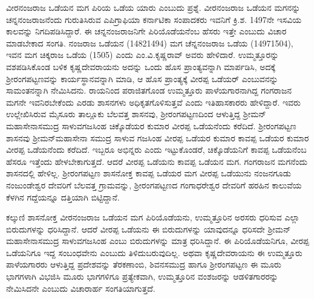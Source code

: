 ವೀರನಂಜರಾಜ ಒಡೆಯನ ಮಗ ಪಿರಿಯ ಒಡೆಯ ಯಾರು ಎಂಬುದು ಪ್ರಶ್ನೆ. ವೀರನಂಜರಾಜ ಒಡೆಯನ ಮಗನನ್ನು ಚನ್ನನಂಜರಾಜನೆಂದು ಗುರುತಿಸಿರುವ ಎಪಿಗ್ರಾಫಿಯಾ ಕರ್ನಾಟಿಕಾ ಸಂಪಾದಕರು ಇವನಿಗೆ ಕ್ರಿ.ಶ. 1497ನೇ ಇಸವಿಯ ಕಾಲವನ್ನು ನಿಗದಿಪಡಿಸಿದ್ದಾರೆ. ಈ ಚನ್ನನಂಜರಾಜನಿಗೇ ಪಿರಿಯೊಡೆಯನೆಂಬ ಹೆಸರು ಇತ್ತೇ ಎಂಬುದು ವಿಚಾರ ಮಾಡಬೇಕಾದ ಸಂಗತಿ. ನಂಜರಾಜ ಒಡೆಯನ (14821494) ಮಗ ಚೆನ್ನನಂಜರಾಜ ಒಡೆಯ (14971504), ಇವನ ಮಗ ಚಿಕ್ಕರಾಜ ಒಡೆಯ (1505) ಎಂದು ಎಂ.ವಿ.ಕೃಷ್ಣರಾವ್​ ಅವರು ಹೇಳಿದಾರೆ. ಉಮ್ಮತ್ತೂರನ್ನು ವಶಪಡಿಸಿಕೊಂಡ ಬಳಿಕ ಕೃಷ್ಣದೇವರಾಯನು ಅದನ್ನು ಒಂದು ಹೊಸ ಪ್ರಾಂತ್ಯವನ್ನಾಗಿ ಮಾರ್ಪಡಿಸಿ, ಅದಕ್ಕೆ ಶ‍್ರೀರಂಗಪಟ್ಟಣವನ್ನು ಕಾರ್ಯಸ್ಥಾನವನ್ನಾಗಿ ಮಾಡಿ, ಆ ಹೊಸ ಪ್ರಾಂತ್ಯಕ್ಕೆ ವೀರಪ್ಪ ಒಡೆಯರ್​ ಎಂಬುವನನ್ನು ಸಾಮಂತನನ್ನಾಗಿ ನೇಮಿಸಿದನು. ರಾಯನಿಂದ ಪರಾಜಿತಗೊಂಡ ಉಮ್ಮತ್ತೂರು ಪಾಳೆಯಗಾರನಾಗಿದ್ದ ಗಂಗರಾಜನ ಮಗನೇ ಇವನಿರಬೇಕೆಂದು ಎರಡು ಶಾಸನಗಳು ಅಧಿಕೃತಗೊಳಿಸುತ್ತವೆ ಎಂದು ಇತಿಹಾಸಕಾರರು ಹೇಳಿದ್ದಾರೆ. ಇವರು ಉಲ್ಲೇಖಿಸಿರುವ ಮೈಸೂರು ತಾಲ್ಲೂಕು ಬೆಲವತ್ತ ಶಾಸನವು, ಶ‍್ರೀರಂಗಪಟ್ಟಣದಿಂದ ಆಳುತ್ತಿದ್ದ ಶ‍್ರೀಮನ್​ ಮಹಾಸೇನಾಸಮುದ್ರ ಸಾಳುವಗಜಸಿಂಹ ಚಿಕ್ಕೊಡೆಯರ ಕುಮಾರ ವೀರಪ್ಪ ಒಡೆಯನೆಂದು ಕರೆದಿದೆ. ಶ‍್ರೀರಂಗಪಟ್ಟಣ ಶಾಸನವು ಶ‍್ರೀಮನ್​ ಮಹಾಸೇನಾ ಸಮುದ್ರ ಸಾಳುವ ಗಜಸಿಂಹ ವೀರಪ್ಪ ಒಡೆಯರ ಕುಮಾರ ಕಾವಪ್ಪ ಒಡೆಯರ ಕುಮಾರ ವೀರಪ್ಪ ಒಡೆಯನೆಂದು ಕರೆದಿದೆ. ಇಬ್ಬರೂ ಅಭಿನ್ನರು ಎಂದು ಇಟ್ಟುಕೊಂಡರೆ, ಚಿಕ್ಕೊಡೆಯನಿಗೆ ಕಾವಪ್ಪ ಒಡೆಯನೆಂಬ ಹೆಸರೂ ಇತ್ತೆಂದು ಹೇಳಬೇಕಾಗುತ್ತದೆ. ಆದರೆ ವೀರಪ್ಪ ಒಡೆಯನು ಕಾವಪ್ಪ ಒಡೆಯನ ಮಗ. ಗಂಗರಾಜನ ಮಗನೆಂದು ಶಾಸನದಲ್ಲಿ ಹೇಳಿಲ್ಲ. ಶ‍್ರೀರಂಗಪಟ್ಟಣ ಶಾಸನೋಕ್ತ ಕಾವಪ್ಪ ಒಡೆಯರ ಮಗ ವೀರಪ್ಪ ಒಡೆಯುನು ನಂಜನಗೂಡು ನಂಜುಂಡೇಶ್ವರ ದೇವರಿಗೆ ಬೆಲವತ್ತ ಗ್ರಾಮವನ್ನು, ಶ‍್ರೀರಂಗಪಟ್ಟಣದ ಗಂಗಾಧರೇಶ್ವರ ದೇವರಿಗೆ ಹರಹಿನ ಕಾಲುವೆಯ ಕೆಳಗಿನ ಗದ್ದೆಯನ್ನೂ ದತ್ತಿಯಾಗಿ ಬಿಟ್ಟಿದ್ದಾನೆ. 

ಕಲ್ಕುಣಿ ಶಾಸನೋಕ್ತ ವೀರನಂಜರಾಜ ಒಡೆಯನ ಮಗ ಪಿರಿಯೊಡೆಯನು, ಉಮ್ಮತ್ತೂರಿನ ಅರಸರು ಧರಿಸುವ ಎಲ್ಲಾ ಬಿರುದುಗಳನ್ನು ಧರಿಸಿದ್ದಾನೆ. ಆದರೆ ವೀರಪ್ಪ ಒಡೆಯನು ಈ ಬಿರುದುಗಳನ್ನು ಯಾವುದನ್ನೂ ಧರಿಸದೇ ಶ‍್ರೀಮನ್​ ಮಹಾಸೇನಾಸಮುದ್ರ ಸಾಳುವಗಜಸಿಂಹ ಎಂಬು ಬಿರುದುಗಳನ್ನು ಮಾತ್ರ ಧರಿಸಿದ್ದಾನೆ. ಈ ಪಿರಿಯೊಡೆಯನಿಗೂ, ವೀರಪ್ಪ ಒಡೆಯನಿಗೂ ಇದ್ದ ಸಂಬಂಧವೇನು ಎಂಬುದು ತಿಳಿದುಬರುವುದಿಲ್ಲ. ಅಥವಾ ಕೃಷ್ಣದೇವರಾಯನು ಈ ಉಮ್ಮತ್ತೂರು ಪಾಳೆಯಗಾರರು ಆಳುತ್ತಿದ್ದ ಪ್ರದೇಶವನ್ನು ತೆರಕಣಾಂಬಿ, ಶಿವನಸಮುದ್ರ ಹಾಗೂ ಶ‍್ರೀರಂಗಪಟ್ಟಣ ಈ ಮೂರು ಭಾಗಗಳಾಗಿ ವಿಭಜಿಸಿ ಮೂರು ಭಾಗಗಳಿಗೂ ಪ್ರತ್ಯೇಕವಾಗಿ, ಉಮ್ಮತ್ತೂರಿನ ವಂಶಜರನ್ನು ಆಡಳಿತಗಾರರನ್ನು ನೇಮಿಸಿದನೇ ಎಂಬುದು ವಿಚಾರಾರ್ಹ ಸಂಗತಿಯಾಗುತ್ತದೆ. 


